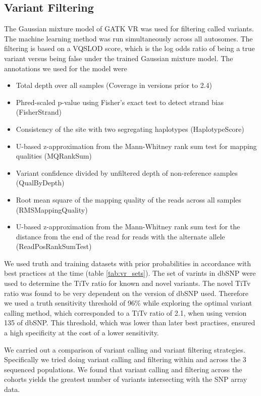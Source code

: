 \subsection{Variant Filtering}
The Gaussian mixture model of \gls{GATK} \gls{VR} was used for filtering called variants. The machine learning method was run simultaneously across all autosomes. The filtering is based on a \gls{VQSLOD} score, which is the log odds ratio of being a true variant versus being false under the trained Gaussian mixture model. The annotations we used for the model were
\begin{itemize}
\item Total depth over all samples (Coverage in versions prior to 2.4)
\item Phred-scaled p-value using Fisher’s exact test to detect strand bias (FisherStrand)
\item Consistency of the site with two segregating haplotypes (HaplotypeScore)
\item U-based z-approximation from the Mann-Whitney rank sum test for mapping qualities (MQRankSum)
\item Variant confidence divided by unfiltered depth of non-reference samples (QualByDepth)
\item Root mean square of the mapping quality of the reads across all samples (RMSMappingQuality)
\item U-based z-approximation from the Mann-Whitney rank sum test for the distance from the end of the read for reads with the alternate allele (ReadPosRankSumTest)
\end{itemize}

We used truth and training datasets with prior probabilities in accordance with best practices at the time (table \ref{tab:vr_sets}). The set of varints in \gls{dbSNP}\cite{Wheeler01012007} were used to determine the \gls{TiTv} ratio for known and novel variants. The novel \gls{TiTv} ratio was found to be very dependent on the version of \gls{dbSNP} used. Therefore we used a truth sensitivity threshold of 96\% while exploring the optimal variant calling method, which corresponded to a \gls{TiTv} ratio of 2.1, when using version 135 of \gls{dbSNP}. This threshold, which was lower than later best practises, ensured a high specificity at the cost of a lower sensitivity.


We carried out a comparison of variant calling and variant filtering strategies. Specifically we tried doing variant calling and filtering within and across the 3 sequenced populations. We found that variant calling and filtering across the cohorts yields the greatest number of variants intersecting with the SNP array data.

